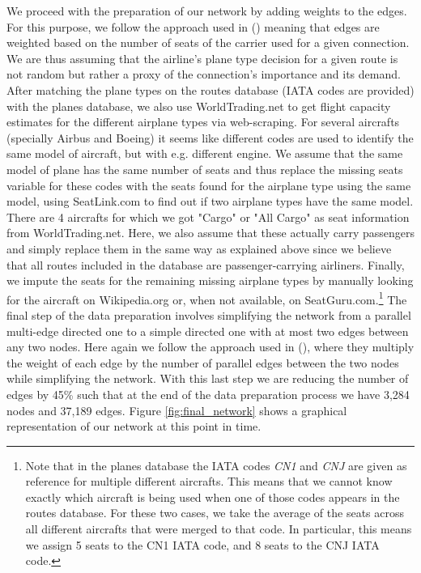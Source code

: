 \documentclass{Resources/netsci-project}
\begin{document}
We proceed with the preparation of our network by adding weights to the edges. For this purpose, we follow the approach used in \citeauthor{Lawyer2016} (\citeyear{Lawyer2016}) meaning that edges are weighted based on the number of seats of the carrier used for a given connection. We are thus assuming that the airline's plane type decision for a given route is not random but rather a proxy of the connection's importance and its demand. After matching the plane types on the routes database (IATA codes are provided) with the planes database, we also use WorldTrading.net to get flight capacity estimates for the different airplane types via web-scraping. For several aircrafts (specially Airbus and Boeing) it seems like different codes are used to identify the same model of aircraft, but with e.g. different engine. We assume that the same model of plane has the same number of seats and thus replace the missing seats variable for these codes with the seats found for the airplane type using the same model, using SeatLink.com to find out if two airplane types have the same model. There are 4 aircrafts for which we got "Cargo" or "All Cargo" as seat information from WorldTrading.net. Here, we also assume that these actually carry passengers and simply replace them in the same way as explained above since we believe that all routes included in the database are passenger-carrying airliners. Finally, we impute the seats for the remaining missing airplane types by manually looking for the aircraft on Wikipedia.org or, when not available, on SeatGuru.com.\footnote{Note that in the planes database the IATA codes \textit{CN1} and \textit{CNJ} are given as reference for multiple different aircrafts. This means that we cannot know exactly which aircraft is being used when one of those codes appears in the routes database. For these two cases, we take the average of the seats across all different aircrafts that were merged to that code. In particular, this means we assign 5 seats to the CN1 IATA code, and 8 seats to the CNJ IATA code.} The final step of the data preparation involves simplifying the network from a parallel multi-edge directed one to a simple directed one with at most two edges between any two nodes. Here again we follow the approach used in \citeauthor{Lawyer2016} (\citeyear{Lawyer2016}), where they multiply the weight of each edge by the number of parallel edges between the two nodes while simplifying the network. With this last step we are reducing the number of edges by 45\% such that at the end of the data preparation process we have 3,284 nodes and 37,189 edges. Figure \ref{fig:final_network} shows a graphical representation of our network at this point in time. 
\end{document}
